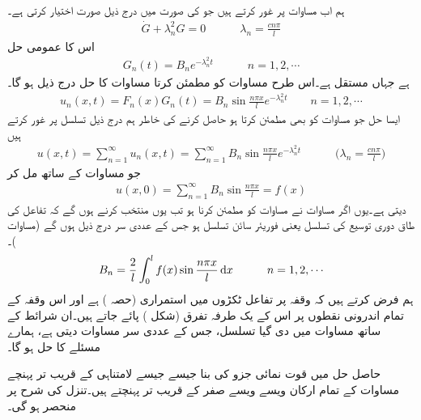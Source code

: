 ہم اب مساوات  پر غور کرتے ہیں جو  کی صورت میں درج ذیل صورت اختیار کرتی ہے۔
\begin{align*}
\dot{G}+\lambda_n^2G=0\quad \quad \quad \lambda_n=\frac{cn\pi}{l}
\end{align*}
اس کا عمومی حل
\begin{align*}
G_n(t)=B_ne^{-\lambda_n^2t}\quad \quad \quad n=1,2,\cdots
\end{align*}
ہے جہاں  مستقل ہے۔اس طرح مساوات  کو مطمئن کرتا مساوات  کا حل درج ذیل ہو گا۔
\begin{align}\label{مساوات_جزوی_حل_حرارت_ث}
u_n(x,t)=F_n(x)G_n(t)=B_n\sin\frac{n\pi x}{l}e^{-\lambda_n^2t}\quad \quad n=1,2,\cdots
\end{align}
\quad ایسا حل جو مساوات  کو بھی مطمئن کرتا ہو حاصل کرنے کی خاطر ہم درج ذیل تسلسل پر غور کرتے ہیں
\begin{align}\label{مساوات_جزوی_حل_حرارت_ج}
u(x,t)=\sum_{n=1}^{\infty} u_n(x,t)=\sum_{n=1}^{\infty}B_n\sin\frac{n\pi x}{l}e^{-\lambda_n^2t}\quad \quad\quad \big(\lambda_n=\frac{cn\pi}{l}\big)
\end{align}
جو مساوات  کے  ساتھ مل کر
\begin{align*}
u(x,0)=\sum_{n=1}^{\infty} B_n\sin\frac{n\pi x}{l}=f(x)
\end{align*}
دیتی ہے۔یوں  اگر مساوات  نے مساوات  کو مطمئن کرنا ہو تب  یوں منتخب کرنے ہوں گے کہ  تفاعل  کی طاق دوری توسیع کی تسلسل یعنی فوریئر سائن تسلسل ہو جس کے عددی سر درج ذیل ہوں گے (مساوات )۔
\begin{align}\label{مساوات_جزوی_حل_حرارت_چ}
B_n=\frac{2}{l}\int_0^l f(x)\sin\frac{n\pi x}{l}\dif x\quad \quad \quad n=1,2,\cdots
\end{align}
ہم فرض کرتے ہیں کہ وقفہ  پر تفاعل  ٹکڑوں میں استمراری (حصہ ) ہے  اور اس وقفہ کے تمام اندرونی نقطوں پر اس کے یک طرفہ تفرق (شکل ) پائے جاتے ہیں۔ان شرائط کے ساتھ مساوات  میں دی گیا تسلسل، جس کے عددی سر مساوات  دیتی ہے، ہمارے مسئلے کا حل ہو گا۔

حاصل حل میں قوت نمائی جزو کی بنا جیسے جیسے  لامتناہی کے قریب تر پہنچے مساوات  کے تمام ارکان ویسے ویسے صفر کے قریب تر پہنچتے ہیں۔تنزل کی شرح  پر منحصر ہو گی۔

